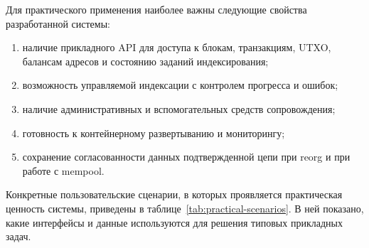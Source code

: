 Для практического применения наиболее важны следующие свойства разработанной
системы:
\begin{enumerate}
    \item наличие прикладного API для доступа к блокам, транзакциям, UTXO,
    балансам адресов и состоянию заданий индексирования;
    \item возможность управляемой индексации с контролем прогресса и ошибок;
    \item наличие административных и вспомогательных средств сопровождения;
    \item готовность к контейнерному развертыванию и мониторингу;
    \item сохранение согласованности данных подтвержденной цепи при reorg и при работе с mempool.
\end{enumerate}

Конкретные пользовательские сценарии, в которых проявляется практическая
ценность системы, приведены в таблице~\ref{tab:practical-scenarios}. В ней
показано, какие интерфейсы и данные используются для решения типовых
прикладных задач.

